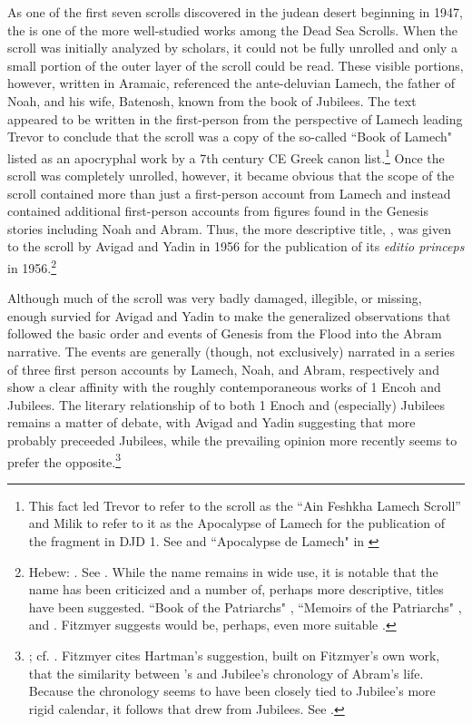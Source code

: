 As one of the first seven scrolls discovered in the judean desert beginning in 1947, the \ga is one of the more well-studied works among the Dead Sea Scrolls. When the scroll was initially analyzed by scholars, it could not be fully unrolled and only a small portion of the outer layer of the scroll could be read. These visible portions, however, written in Aramaic, referenced the ante-deluvian Lamech, the father of Noah, and his wife, Batenosh, known from the book of Jubilees. The text appeared to be written in the first-person from the perspective of Lamech leading Trevor to conclude that the scroll was a copy of the so-called ``Book of Lamech" listed as an apocryphal work by a 7th century CE Greek canon list.\footnote{This fact led Trevor to refer to the scroll as the ``Ain Feshkha Lamech Scroll'' and Milik to refer to it as the Apocalypse of Lamech for the publication of the fragment in DJD 1. See \cite[9--10]{trevor_basor1949} and ``Apocalypse de Lamech" in \cite[86--87]{djd_1}} Once the scroll was completely unrolled, however, it became obvious that the scope of the scroll contained more than just a first-person account from Lamech and instead contained additional first-person accounts from figures found in the Genesis stories including Noah and Abram. Thus, the more descriptive title, , was given to the scroll by Avigad and Yadin in 1956 for the publication of its \emph{editio princeps} in 1956.\footnote{Hebew: . See \cite{avigad-yadin1956}. While the name \ga remains in wide use, it is notable that the name has been criticized and a number of, perhaps more descriptive, titles have been suggested. ``Book of the Patriarchs" \autocite[Hebrew: . As suggested by Mazar in][379 n. 2]{flusser_ks1956}, ``Memoirs of the Patriarchs" \autocite[as suggested by][358]{gaster1976}, and  \autocite[as suggested by][14 n. 1.]{milik1959}.  Fitzmyer suggests  would be, perhaps, even more suitable \autocite[16]{fitzmyer2004}.}

Although much of the scroll was very badly damaged, illegible, or missing, enough survied for Avigad and Yadin to make the generalized observations that \ga followed the basic order and events of Genesis from the Flood into the Abram narrative. The events are generally (though, not exclusively) narrated in a series of three first person accounts by Lamech, Noah, and Abram, respectively and show a clear affinity with the roughly contemporaneous works of 1 Encoh and Jubilees.\autocite[16--37]{avigad-yadin1956} The literary relationship of \ga to both 1 Enoch and (especially) Jubilees remains a matter of debate, with Avigad and Yadin suggesting that \ga more probably preceeded Jubilees, while the prevailing opinion more recently seems to prefer the opposite.\footnote{\cite[38]{avigad-yadin1956}; cf. \cite[20--21]{fitzmyer2004}. Fitzmyer cites Hartman's suggestion, built on Fitzmyer's own work, that the similarity between \ga's and Jubilee's chronology of Abram's life. Because the chronology seems to have been closely tied to Jubilee's more rigid calendar, it follows that \ga drew from Jubilees. See \cite[497]{hartman_cbq1966}.}

